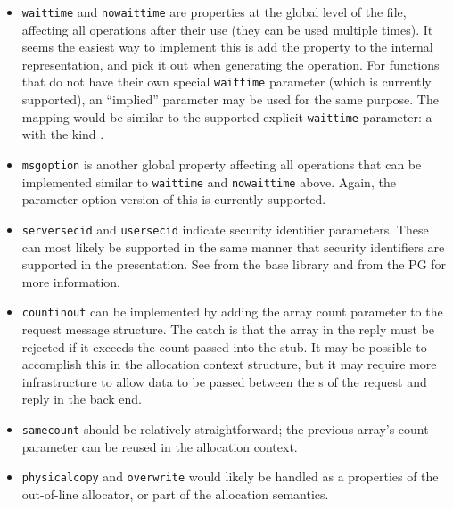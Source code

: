 \begin{itemize}
  \item \texttt{waittime} and \texttt{nowaittime} are properties at the global
  level of the \IDL{} file, affecting all operations after their use (they can
  be used multiple times).  It seems the easiest way to implement this is add
  the property to the internal representation, and pick it out when generating
  the operation.  For functions that do not have their own special
  \texttt{waittime} parameter (which is currently supported), an ``implied''
  parameter may be used for the same purpose.  The mapping would be similar to
  the supported explicit \texttt{waittime} parameter: a
   with the kind
  .

  \item \texttt{msgoption} is another global property affecting all operations
  that can be implemented similar to \texttt{waittime} and \texttt{nowaittime}
  above.  Again, the parameter option version of this is currently supported.

  \item \texttt{serversecid} and \texttt{usersecid} indicate security
  identifier parameters.  These can most likely be supported in the same manner
  that security identifiers are supported in the \CORBA{} presentation.  See
   from the base library and
   from the \CORBA{} PG for more
  information.

  \item \texttt{countinout} can be implemented by adding the array count
  parameter to the request message \PRESC{} structure.  The catch is that the
  array in the reply must be rejected if it exceeds the count passed into the
  stub.  It may be possible to accomplish this in the allocation context
  structure, but it may require more infrastructure to allow data to be passed
  between the s of the request and reply in the back end.

  \item \texttt{samecount} should be relatively straightforward; the previous
  array's count parameter can be reused in the allocation context.

  \item \texttt{physicalcopy} and \texttt{overwrite} would likely be handled as
  a properties of the out-of-line allocator, or part of the allocation
  semantics.


\end{itemize}
